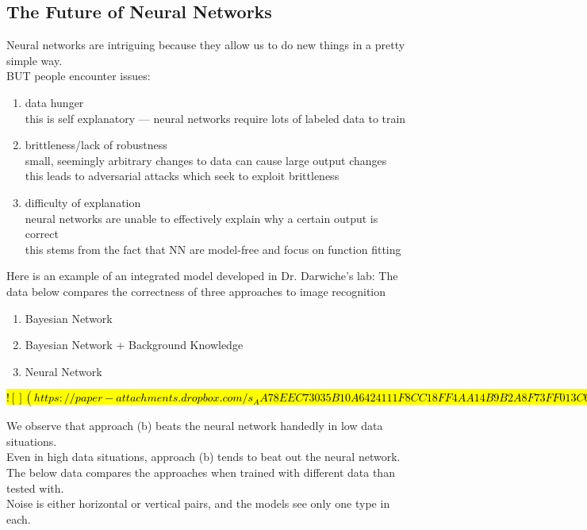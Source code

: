 \documentclass[../../lecture_notes.tex]{subfiles}
\begin{document}
\subsection*{The Future of Neural Networks}
\noindent Neural networks are intriguing because they allow us to do new things in a pretty simple way.\\
BUT people encounter issues:
	\begin{enumerate} [itemsep=0mm]
		\item data hunger\\
			this is self explanatory — neural networks require lots of labeled data to train
		\item brittleness/lack of robustness\\
			small, seemingly arbitrary changes to data can cause large output changes\\
			this leads to adversarial attacks which seek to exploit brittleness
		\item difficulty of explanation\\
			neural networks are unable to effectively explain why a certain output is correct\\
			this stems from the fact that NN are model-free and focus on function fitting
	\end{enumerate}\medskip

\noindent Here is an example of an integrated model developed in Dr. Darwiche’s lab:
The data below compares the correctness of three approaches to image recognition
	\begin{enumerate} [itemsep=0mm]
		\item Bayesian Network
		\item Bayesian Network + Background Knowledge
		\item Neural Network
	\end{enumerate}

\hl{
$![](https://paper-attachments.dropbox.com/s_AA78EEC73035B10A6424111F8CC18FF4AA14B9B2A8F73FF013C6765837E92F61_1591304763546_Untitled+drawing+4.jpg)$
}

\noindent We observe that approach (b) beats the neural network handedly in low data situations.\\
Even in high data situations, approach (b) tends to beat out the neural network.\\

The below data compares the approaches when trained with different data than tested with.\\
Noise is either horizontal or vertical pairs, and the models see only one type in each.\\
\end{document}
